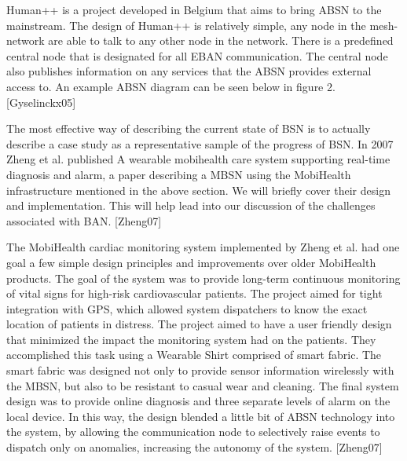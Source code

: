 Human++ is a project developed in Belgium that aims to bring ABSN to the mainstream. The design of Human++ is relatively simple, any node in the mesh-network are able to talk to any other node in the network. There is a predefined central node that is designated for all EBAN communication. The central node also publishes information on any services that the ABSN provides external access to. An example ABSN diagram can be seen below in figure 2. [Gyselinckx05]

The most effective way of describing the current state of BSN is to actually describe a case study as a representative sample of the progress of BSN. In 2007 Zheng et al. published A wearable mobihealth care system supporting real-time diagnosis and alarm, a paper describing a MBSN using the MobiHealth infrastructure mentioned in the above section. We will briefly cover their design and implementation. This will help lead into our discussion of the challenges associated with BAN. [Zheng07]

The MobiHealth cardiac monitoring system implemented by Zheng et al. had one goal a few simple design principles and improvements over older MobiHealth products. The goal of the system was to provide long-term continuous monitoring of vital signs for high-risk cardiovascular patients. The project aimed for tight integration with GPS, which allowed system dispatchers to know the exact location of patients in distress. The project aimed to have a user friendly design that minimized the impact the monitoring system had on the patients. They accomplished this task using a Wearable Shirt comprised of smart fabric. The smart fabric was designed not only to provide sensor information wirelessly with the MBSN, but also to be resistant to casual wear and cleaning. The final system design was to provide online diagnosis and three separate levels of alarm on the local device. In this way, the design blended a little bit of ABSN technology into the system, by allowing the communication node to selectively raise events to dispatch only on anomalies, increasing the autonomy of the system. [Zheng07]
